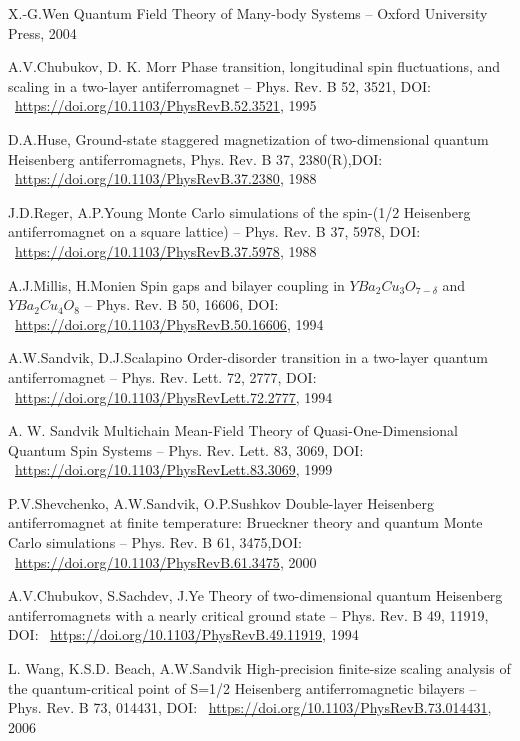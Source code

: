 \documentclass[11pt]{article}
\begin{document}
\begin{thebibliography}{3}
X.-G.Wen Quantum Field Theory of Many-body Systems -- Oxford University Press, 2004

A.V.Chubukov, D. K. Morr Phase transition, longitudinal spin fluctuations, and scaling in a two-layer antiferromagnet -- Phys. Rev. B 52, 3521, DOI: ~\url{https://doi.org/10.1103/PhysRevB.52.3521}, 1995

D.A.Huse, Ground-state staggered magnetization of two-dimensional quantum Heisenberg antiferromagnets, Phys. Rev. B 37, 2380(R),DOI: ~\url{https://doi.org/10.1103/PhysRevB.37.2380}, 1988

J.D.Reger, A.P.Young Monte Carlo simulations of the spin-(1/2 Heisenberg antiferromagnet on a square lattice) -- Phys. Rev. B 37, 5978, DOI: ~\url{https://doi.org/10.1103/PhysRevB.37.5978}, 1988

A.J.Millis, H.Monien Spin gaps and bilayer coupling in $YBa_2Cu_3O_{7-\delta }$ and $YBa_2Cu_4O_8$ -- Phys. Rev. B 50, 16606, DOI: ~\url{https://doi.org/10.1103/PhysRevB.50.16606}, 1994

A.W.Sandvik, D.J.Scalapino Order-disorder transition in a two-layer quantum antiferromagnet -- Phys. Rev. Lett. 72, 2777, DOI: ~\url{https://doi.org/10.1103/PhysRevLett.72.2777}, 1994

A. W. Sandvik Multichain Mean-Field Theory of Quasi-One-Dimensional Quantum Spin Systems -- Phys. Rev. Lett. 83, 3069, DOI: ~\url{https://doi.org/10.1103/PhysRevLett.83.3069}, 1999

P.V.Shevchenko, A.W.Sandvik, O.P.Sushkov Double-layer Heisenberg antiferromagnet at finite temperature: Brueckner theory and quantum Monte Carlo simulations -- Phys. Rev. B 61, 3475,DOI: ~\url{https://doi.org/10.1103/PhysRevB.61.3475}, 2000

A.V.Chubukov, S.Sachdev, J.Ye Theory of two-dimensional quantum Heisenberg antiferromagnets with a nearly critical ground state -- Phys. Rev. B 49, 11919, DOI: ~\url{https://doi.org/10.1103/PhysRevB.49.11919}, 1994

L. Wang, K.S.D. Beach, A.W.Sandvik High-precision finite-size scaling analysis of the quantum-critical point of S=1/2 Heisenberg antiferromagnetic bilayers -- Phys. Rev. B 73, 014431, DOI: ~\url{https://doi.org/10.1103/PhysRevB.73.014431}, 2006


\end{thebibliography}
\end{document}
